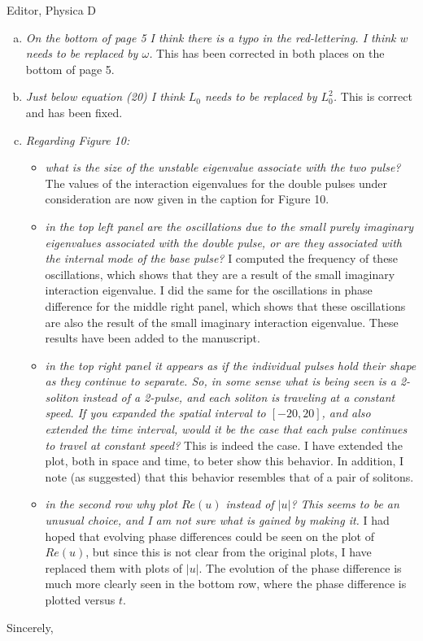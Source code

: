 \documentclass[11pt]{letter}
\begin{document}
\begin{letter}{Editor, Physica D}
\begin{enumerate}[(a)]
\item \emph{On the bottom of page 5 I think there is a typo in the red-lettering. I think $w$ needs to be replaced by $\omega$.} This has been corrected in both places on the bottom of page 5.

\item \emph{Just below equation (20) I think $L_0$ needs to be replaced by $L_0^2$.} This is correct and has been fixed.

\item \emph{Regarding Figure 10:}

\begin{itemize}
\item \emph{what is the size of the unstable eigenvalue associate with the two pulse?} The values of the interaction eigenvalues for the double pulses under consideration are now given in the caption for Figure 10.

\item \emph{in the top left panel are the oscillations due to the small purely imaginary eigenvalues associated with the double pulse, or are they associated with the internal mode of the base pulse?} I computed the frequency of these oscillations, which shows that they are a result of the small imaginary interaction eigenvalue. I did the same for the oscillations in phase difference for the middle right panel, which shows that these oscillations are also the result of the small imaginary interaction eigenvalue. These results have been added to the manuscript.

\item \emph{in the top right panel it appears as if the individual pulses hold their shape as they continue to separate. So, in some sense what is being seen is a 2-soliton instead of a 2-pulse, and each soliton is traveling at a constant speed. If you expanded the spatial interval to $[-20, 20]$, and also extended the time interval, would it be the case that each pulse continues to travel at constant speed?} This is indeed the case. I have extended the plot, both in space and time, to beter show this behavior. In addition, I note (as suggested) that this behavior resembles that of a pair of solitons.

\item \emph{in the second row why plot $Re(u)$ instead of $|u|$? This seems to be an unusual choice, and I am not sure what is gained by making it.} I had hoped that evolving phase differences could be seen on the plot of $Re(u)$, but since this is not clear from the original plots, I have replaced them with plots of $|u|$. The evolution of the phase difference is much more clearly seen in the bottom row, where the phase difference is plotted versus $t$.

\end{itemize}

\end{enumerate}

\closing{Sincerely,}

\end{letter}
\end{document}
